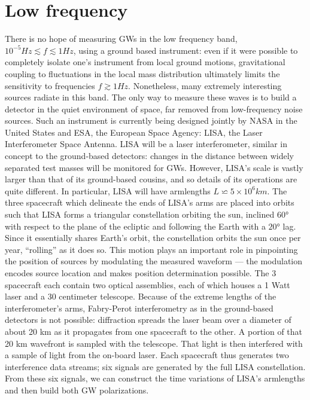 \documentclass[binding=0.6cm, LaM]{sapthesis}
\begin{document}
\section{Low frequency}
There is no hope of measuring GWs in the low frequency band, $10^{-5} Hz \apprle f \apprle 1 Hz$, using a ground based instrument: even if it were possible to completely isolate one’s instrument from 
local ground motions, gravitational coupling to fluctuations in the local mass distribution ultimately limits the sensitivity to frequencies $f \apprge 1 Hz$. 
Nonetheless, many extremely interesting sources radiate in this band. 
The only way to measure these waves is to build a detector in the quiet environment of space, far removed from low-frequency noise sources.
Such an instrument is currently being designed jointly by NASA in the United States and ESA, the European Space Agency: LISA, the Laser Interferometer Space Antenna. LISA will be a laser 
interferometer, similar in concept to the ground-based detectors: changes in the distance between widely separated test masses will be monitored for GWs. 
However, LISA’s scale is vastly larger than that of its ground-based cousins, and so details of its operations are quite different. 
In particular, LISA will have armlengths $L \backsimeq 5 \times 10^6 km$. The three spacecraft which delineate the ends of LISA’s arms are placed into orbits such that LISA forms a triangular 
constellation orbiting the sun, inclined $\ang{60}$ with respect to the plane of the ecliptic and following the Earth with a $\ang{20}$ lag.
Since it essentially shares Earth’s orbit, the constellation orbits the sun once per year, “rolling” as it does so. 
This motion plays an important role in pinpointing the position of sources by modulating the measured waveform — the modulation encodes source location and makes position determination possible.
The 3 spacecraft each contain two optical assemblies, each of which houses a 1 Watt laser and a 30 centimeter telescope.
 Because of the extreme lengths of the interferometer’s arms, Fabry-Perot interferometry as in the ground-based detectors is not possible: 
diffraction spreads the laser beam over a diameter of about 20 km as it propagates from one spacecraft to the other. A portion of that 20 km wavefront is sampled with the telescope. 
That light is then interfered with a sample of light from the on-board laser. Each spacecraft thus generates two interference data streams; six signals are generated by the full LISA constellation. 
From these six signals, we can construct the time variations of LISA’s armlengths and then build both GW polarizations. 
\end{document}
